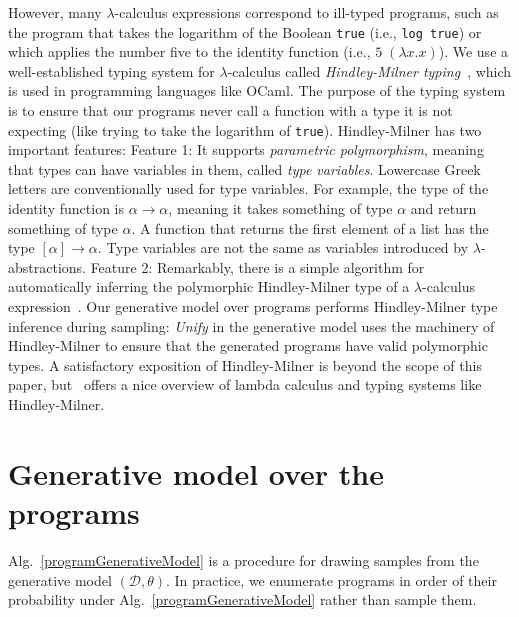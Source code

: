 \documentclass{article}
\begin{document}
However, many $\lambda$-calculus expressions correspond to ill-typed programs, such as the program that takes the logarithm of the Boolean \texttt{true} (i.e., \texttt{log true}) or which applies the number five to the identity function
(i.e., $5 \; (\lambda x.x)$).
We use a well-established typing system for $\lambda$-calculus called \emph{Hindley-Milner typing}~\cite{pierce}, which is used in programming languages like OCaml.
The purpose of the typing system is to ensure that our programs never call a function with a type it is not expecting (like trying to take the logarithm of \texttt{true}).
Hindley-Milner has two important features:
Feature 1: It supports \emph{parametric polymorphism}, meaning that types can have variables in them, called \emph{type variables}. Lowercase Greek letters are conventionally used for  type variables.
For example, the type of the identity function is $\alpha\to\alpha$, meaning it takes something of type $\alpha$ and return something of type $\alpha$. A function that returns the first element of a list has the type $[\alpha]\to\alpha$. Type variables are not the same as variables introduced by $\lambda$-abstractions.
Feature 2: Remarkably, there is a  simple algorithm for automatically inferring the polymorphic Hindley-Milner type of a $\lambda$-calculus expression~\cite{damas1982principal}.
Our generative model over programs performs Hindley-Milner type inference during sampling:
\emph{Unify} in the generative model uses the machinery of Hindley-Milner to
ensure that the generated programs have valid polymorphic types.
A satisfactory exposition of Hindley-Milner is beyond the scope of this paper,
but~\cite{pierce} offers a nice overview of lambda calculus and typing systems like Hindley-Milner.



\section{Generative model over the programs}

Alg.~\ref{programGenerativeModel} is a procedure for drawing
samples from the generative model $(\mathcal{D},\theta)$.  In practice, we
enumerate programs in order of their probability under  Alg.~\ref{programGenerativeModel} rather than sample them.
\end{document}
